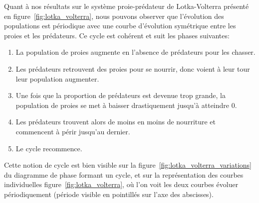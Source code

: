 \documentclass{article}
\begin{document}
Quant à nos résultats sur le système proie-prédateur de Lotka-Volterra présenté en figure~\ref{fig:lotka_volterra}, nous pouvons observer que l'évolution des populations est périodique avec une courbe d'évolution symétrique entre les proies et les prédateurs. Ce cycle est cohérent et suit les phases suivantes:\\
\begin{enumerate}
  \item La population de proies augmente en l'absence de prédateurs pour les chasser.
  \item Les prédateurs retrouvent des proies pour se nourrir, donc voient à leur tour leur population augmenter.
  \item Une fois que la proportion de prédateurs est devenue trop grande, la population de proies se met à baisser drastiquement jusqu'à atteindre 0.
  \item Les prédateurs trouvent alors de moins en moins de nourriture et commencent à périr jusqu'au dernier.
  \item Le cycle recommence.
\end{enumerate}
Cette notion de cycle est bien visible sur la figure~\ref{fig:lotka_volterra_variations} du diagramme de phase formant un cycle, et sur la représentation des courbes individuelles figure~\ref{fig:lotka_volterra}, où l'on voit les deux courbes évoluer périodiquement (période visible en pointillés sur l'axe des abscisses).
\end{document}
